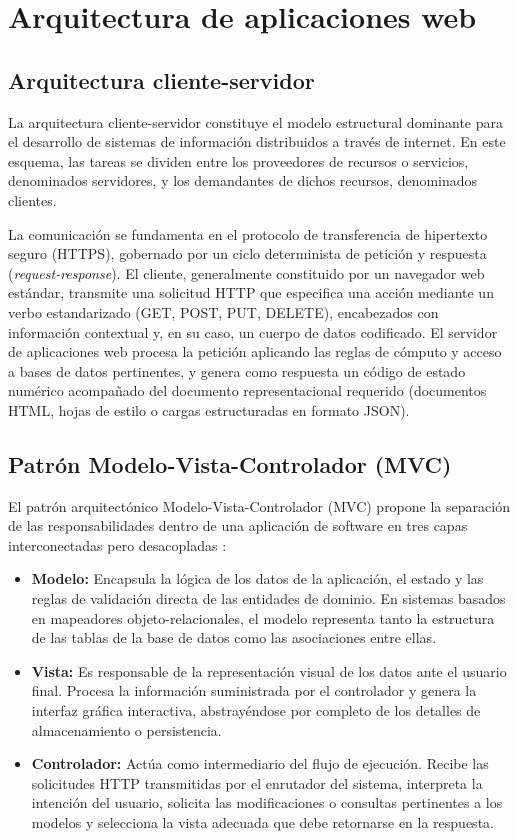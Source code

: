 \section{Arquitectura de aplicaciones web}

\subsection{Arquitectura cliente-servidor}

La arquitectura cliente-servidor constituye el modelo estructural dominante para el desarrollo de sistemas de información distribuidos a través de internet. En este esquema, las tareas se dividen entre los proveedores de recursos o servicios, denominados servidores, y los demandantes de dichos recursos, denominados clientes.

La comunicación se fundamenta en el protocolo de transferencia de hipertexto seguro (HTTPS), gobernado por un ciclo determinista de petición y respuesta (\textit{request-response}). El cliente, generalmente constituido por un navegador web estándar, transmite una solicitud HTTP que especifica una acción mediante un verbo estandarizado (GET, POST, PUT, DELETE), encabezados con información contextual y, en su caso, un cuerpo de datos codificado. El servidor de aplicaciones web procesa la petición aplicando las reglas de cómputo y acceso a bases de datos pertinentes, y genera como respuesta un código de estado numérico acompañado del documento representacional requerido (documentos HTML, hojas de estilo o cargas estructuradas en formato JSON).

\subsection{Patrón Modelo-Vista-Controlador (MVC)}

El patrón arquitectónico Modelo-Vista-Controlador (MVC) propone la separación de las responsabilidades dentro de una aplicación de software en tres capas interconectadas pero desacopladas \cite{sommerville2011software}:

\begin{itemize}
    \item \textbf{Modelo:} Encapsula la lógica de los datos de la aplicación, el estado y las reglas de validación directa de las entidades de dominio. En sistemas basados en mapeadores objeto-relacionales, el modelo representa tanto la estructura de las tablas de la base de datos como las asociaciones entre ellas.
    \item \textbf{Vista:} Es responsable de la representación visual de los datos ante el usuario final. Procesa la información suministrada por el controlador y genera la interfaz gráfica interactiva, abstrayéndose por completo de los detalles de almacenamiento o persistencia.
    \item \textbf{Controlador:} Actúa como intermediario del flujo de ejecución. Recibe las solicitudes HTTP transmitidas por el enrutador del sistema, interpreta la intención del usuario, solicita las modificaciones o consultas pertinentes a los modelos y selecciona la vista adecuada que debe retornarse en la respuesta.
\end{itemize}

